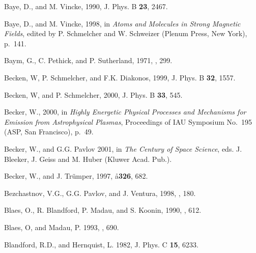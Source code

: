 \begin{references}
\harvarditem{}{}{}
Baye, D., and M. Vincke, 1990, J. Phys. B {\bf 23}, 2467.

\harvarditem{}{}{}
Baye, D., and M. Vincke, 1998, in {\it Atoms and Molecules in Strong Magnetic
Fields}, edited by P. Schmelcher and W. Schweizer (Plenum Press, New York),
p.~141.

\harvarditem{}{}{}
Baym, G., C. Pethick, and P. Sutherland, 1971, , 299.

\harvarditem{}{}{}
Becken, W, P. Schmelcher, and F.K. Diakonos, 1999, J. Phys. B {\bf 32}, 1557.

\harvarditem{}{}{}
Becken, W, and P. Schmelcher, 2000, J. Phys. B {\bf 33}, 545.


\harvarditem{}{}{}
Becker, W., 2000, 
in {\it Highly Energetic Physical Processes and Mechanisms for Emission
from Astrophysical Plasmas}, Proceedings of IAU Symposium No.~195
(ASP, San Francisco), p.~49.

\harvarditem{}{}{}
Becker, W., and G.G. Pavlov 2001, in {\it The Century of Space Science},
eds. J. Bleeker, J. Geiss and M. Huber (Kluwer Acad. Pub.).

\harvarditem{}{}{}
Becker, W., and J. Tr\"umper, 1997, 
\aa {\bf 326}, 682.


\harvarditem{}{}{}
Bezchastnov, V.G., G.G. Pavlov, and J. Ventura, 1998, 
, 180.

\harvarditem{}{}{}
Blaes, O., R. Blandford, P. Madau, and S. Koonin, 1990, , 612.

\harvarditem{}{}{}
Blaes, O, and Madau, P. 1993, , 690.


\harvarditem{}{}{}
Blandford, R.D., and Hernquist, L. 1982, 
J. Phys. C {\bf 15}, 6233.


\end{references}
